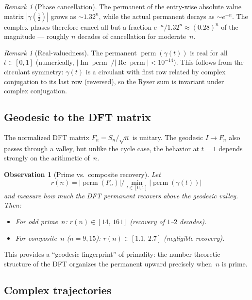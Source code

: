 \documentclass[11pt]{amsart}
\newtheorem{observation}[theorem]{Observation}
\theoremstyle{definition}
\theoremstyle{remark}
\newtheorem{remark}[theorem]{Remark}
\DeclareMathOperator{\perm}{perm}
\begin{document}
\begin{remark}[Phase cancellation]
The permanent of the entry-wise absolute value matrix $|\gamma(\tfrac12)|$ grows
as $\sim 1.32^n$, while the actual permanent decays as $\sim e^{-n}$.
The complex phases therefore cancel all but a fraction $e^{-n}/1.32^n
\approx (0.28)^n$ of the magnitude --- roughly $n$ decades of
cancellation for moderate~$n$.
\end{remark}

\begin{remark}[Real-valuedness]
The permanent $\perm(\gamma(t))$ is real for all $t\in[0,1]$
(numerically, $|\operatorname{Im}\perm|/|\operatorname{Re}\perm|<10^{-14}$).
This follows from the circulant symmetry: $\gamma(t)$ is a circulant
with first row related by complex conjugation to its last row
(reversed), so the Ryser sum is invariant under complex conjugation.
\end{remark}

\subsection{Geodesic to the DFT matrix}\label{sec:dft-geodesic}

The normalized DFT matrix $F_n=S_n/\sqrt{n}$ is unitary.
The geodesic $I\to F_n$ also passes through a valley, but unlike
the cycle case, the behavior at $t=1$ depends strongly on the
arithmetic of~$n$.

\begin{observation}[Prime vs.\ composite recovery]\label{obs:prime}
Let \[r(n)=|\perm(F_n)|/\min_{t\in[0,1]}|\perm(\gamma(t))|\] and measure
how much the DFT permanent recovers above the geodesic valley.
Then:
\begin{itemize}
\item For odd prime~$n$: $r(n)\in[14,\,161]$ (recovery of $1$--$2$ decades).
\item For composite~$n$ ($n=9,15$): $r(n)\in[1.1,\,2.7]$ (negligible recovery).
\end{itemize}
\end{observation}

This provides a ``geodesic fingerprint'' of primality: the
number-theoretic structure of the DFT organizes the permanent
upward precisely when~$n$ is prime.

\subsection{Complex trajectories}\label{sec:complex-traj}
\end{document}
